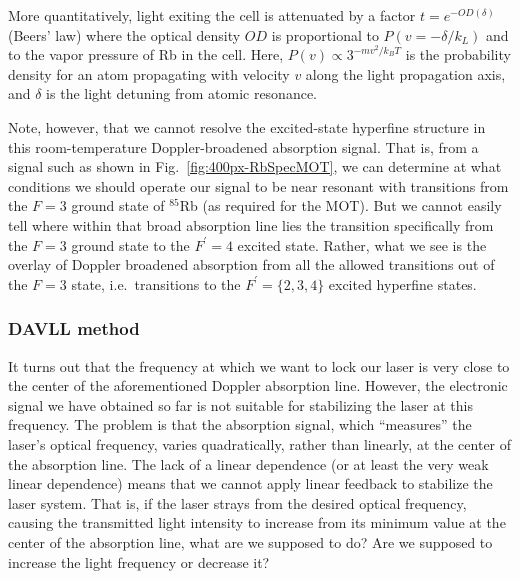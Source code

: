 \documentclass{../lab}
\begin{document}
More quantitatively, light exiting the cell is attenuated by a factor $ t = e^{-OD(\delta)}$ (Beers’ law) where the optical density $OD$ is proportional to $P(v = -\delta / k_L)$ and to the vapor pressure of Rb in the cell.  Here, $P(v) \propto 3^{-m v^2 / k_B T}$ is the probability density for an atom propagating with velocity $v$ along the light propagation axis, and $\delta$ is the light detuning from atomic resonance.

Note, however, that we cannot resolve the excited-state hyperfine structure in this room-temperature Doppler-broadened absorption signal.  That is, from a signal such as shown in Fig.\ \ref{fig:400px-RbSpecMOT}, we can determine at what conditions we should operate our signal to be near resonant with transitions from the $F=3$ ground state of $^{85}$Rb (as required for the MOT).  But we cannot easily tell where within that broad absorption line lies the transition specifically from the $F=3$ ground state to the $F^\prime = 4$ excited state.  Rather, what we see is the overlay of Doppler broadened absorption from all the allowed transitions out of the $F=3$ state, i.e.\ transitions to the $F^\prime = \{2, 3, 4\}$ excited hyperfine states.

\subsubsection{DAVLL method}

It turns out that the frequency at which we want to lock our laser is very close to the center of the aforementioned Doppler absorption line.  However, the electronic signal we have obtained so far is not suitable for stabilizing the laser at this frequency.  The problem is that the absorption signal, which ``measures'' the laser's optical frequency, varies quadratically, rather than linearly, at the center of the absorption line.  The lack of a linear dependence (or at least the very weak linear dependence) means that we cannot apply linear feedback to stabilize the laser system.  That is, if the laser strays from the desired optical frequency, causing the transmitted light intensity to increase from its minimum value at the center of the absorption line, what are we supposed to do?  Are we supposed to increase the light frequency or decrease it?
\end{document}
